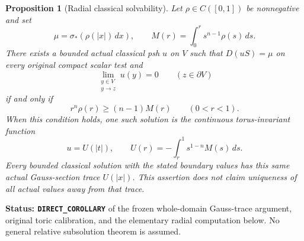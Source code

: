 \documentclass[11pt,a4paper]{article}
\numberwithin{equation}{section}
\newtheorem{proposition}[theorem]{Proposition}
\theoremstyle{definition}
\theoremstyle{remark}
\begin{document}
\begin{proposition}[Radial classical solvability]
\label{prop:r6-radial-toric-dirichlet}
Let $\rho\in C([0,1])$ be nonnegative and set
\[
       \mu=\sigma_*(\rho(|x|)\,dx),\qquad
       M(r)=\int_0^r s^{n-1}\rho(s)\,ds.
\]
There exists a bounded actual classical psh $u$ on $V$ such that
$D(uS)=\mu$ on every original compact scalar test and
\[
          \lim_{\substack{y\in V\\y\to z}}u(y)=0
                                      \qquad(z\in\partial V)
\]
if and only if
\begin{equation}
                r^n\rho(r)\ge(n-1)M(r)
                                      \qquad(0<r<1).
 \label{eq:r6-radial-convexity-condition}
\end{equation}
When this condition holds, one such solution is the continuous
torus-invariant function
\begin{equation}
 u=U(|t|),\qquad
 U(r)=-\int_r^1 s^{1-n}M(s)\,ds.
 \label{eq:r6-radial-toric-solution}
\end{equation}
Every bounded classical solution with the stated boundary values
has this same actual Gauss-section trace $U(|x|)$. This assertion
does not claim uniqueness of all actual values away from that trace.
\end{proposition}

\noindent\textbf{Status: \texttt{DIRECT\_COROLLARY}} of the frozen
whole-domain Gauss-trace argument, original toric calibration, and
the elementary radial computation below. No general relative
subsolution theorem is assumed.
\end{document}
